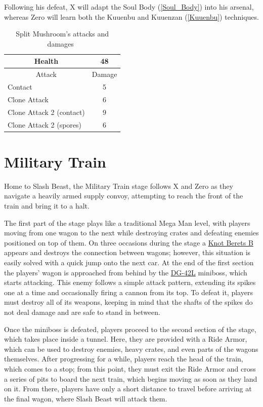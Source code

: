 Following his defeat, X will adapt the Soul Body (\ref{Soul_Body}) into his arsenal, whereas Zero will learn both the Kuuenbu and Kuuenzan (\ref{Kuuenbu}) techniques.

\begin{table}[htp]
	\centering
	\begin{tabular}[h]{l c}
		\toprule
		\multicolumn{1}{c}{Health}  & 48\\
		\midrule
		\multicolumn{1}{c}{Attack} & \multicolumn{1}{c}{Damage}\\
		Contact & 5 \\
		Clone Attack & 6 \\
		Clone Attack 2 (contact) & 9\\
		Clone Attack 2 (spores) & 6\\
		\bottomrule
	\end{tabular}
	\caption{Split Mushroom's attacks and damages~\cite{book:Compendium,wiki:Split_Mushroom}}
\end{table}

\section{Military Train} 
Home to Slash Beast, the Military Train stage follows X and Zero as they navigate a heavily armed supply convoy, attempting to reach the front of the train and bring it to a halt.

The first part of the stage plays like a traditional Mega Man level, with players moving from one wagon to the next while destroying crates and defeating enemies positioned on top of them. On three occasions during the stage a \hyperlink{enem:Knot_Beret_B}{Knot Berets B} appears and destroys the connection between wagons; however, this situation is easily solved with a quick jump onto the next car. At the end of the first section the players’ wagon is approached from behind by the \hyperlink{miniboss:DG-42L}{DG-42L} miniboss, which starts attacking. This enemy follows a simple attack pattern, extending its spikes one at a time and occasionally firing a cannon from its top. To defeat it, players must destroy all of its weapons, keeping in mind that the shafts of the spikes do not deal damage and are safe to stand in between.

Once the miniboss is defeated, players proceed to the second section of the stage, which takes place inside a tunnel. Here, they are provided with a Ride Armor, which can be used to destroy enemies, heavy crates, and even parts of the wagons themselves. After progressing for a while, players reach the head of the train, which comes to a stop; from this point, they must exit the Ride Armor and cross a series of pits to board the next train, which begins moving as soon as they land on it. From there, players have only a short distance to travel before arriving at the final wagon, where Slash Beast will attack them.

